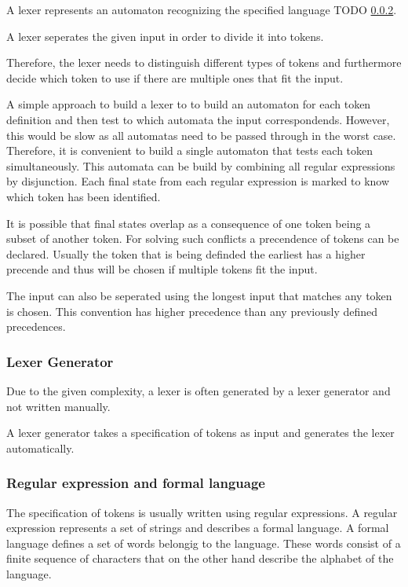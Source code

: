 
A lexer represents an automaton recognizing the specified language TODO \ref{BackgroundRegExp}.

A lexer seperates the given input in order to divide it into tokens. 

Therefore, the lexer needs to distinguish different types of tokens and furthermore decide which token to use if there are multiple ones that fit the input. \cite{Mogensen.2017}

A simple approach to build a lexer to to build an automaton for each token definition and then test to which automata the input correspondends.
However, this would be slow as all automatas need to be passed through in the worst case.
Therefore, it is convenient to build a single automaton that tests each token simultaneously.
This automata can be build by combining all regular expressions by disjunction.
Each final state from each regular expression is marked to know which token has been identified.

It is possible that final states overlap as a consequence of one token being a subset of another token.
For solving such conflicts a precendence of tokens can be declared. Usually the token that is being definded the earliest has a higher precende and thus will be chosen if multiple tokens fit the input. \cite{Mogensen.2017}

The input can also be seperated using the longest input that matches any token is chosen. \cite{Mogensen.2017}
This convention has higher precedence than any previously defined precedences.

\subsubsection{Lexer Generator}

Due to the given complexity, a lexer is often generated by a lexer generator and not written manually.

A lexer generator takes a specification of tokens as input and generates the lexer automatically. 

\subsubsection{Regular expression and formal language}\label{BackgroundRegExp}

The specification of tokens is usually written using regular expressions. 
A regular expression represents a set of strings and describes a formal language. 
A formal language defines a set of words belongig to the language.
These words consist of a finite sequence of characters that on the other hand describe the alphabet of the language.

